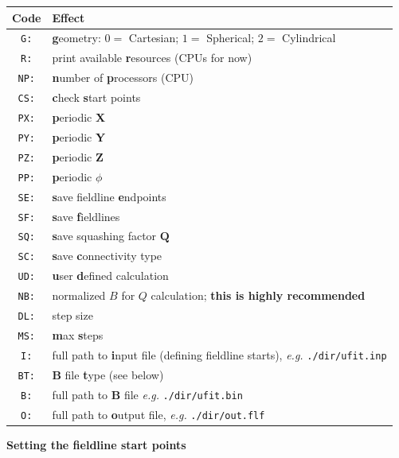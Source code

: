\documentclass[12pt,twoside]{article}
\begin{document}
\begin{tabular}{|c|l|}		
		\hline
		\textbf{Code} & \textbf{Effect} \\\hline\hline
		\texttt{G:} & \textbf{g}eometry: $0 =$ Cartesian; $1 =$ Spherical; $2 =$ Cylindrical  \\\hline
		\texttt{R:} & print available \textbf{r}esources (CPUs for now) \\\hline
		\texttt{NP:} &  \textbf{n}umber of \textbf{p}rocessors (CPU) \\\hline
		\texttt{CS:} & \textbf{c}heck \textbf{s}tart points \\\hline
		\texttt{PX:} & \textbf{p}eriodic \textbf{X} \\\hline
		\texttt{PY:} & \textbf{p}eriodic \textbf{Y}  \\\hline
		\texttt{PZ:} & \textbf{p}eriodic \textbf{Z}  \\\hline
		\texttt{PP:} & \textbf{p}eriodic $\phi$  \\\hline
		\texttt{SE:} & \textbf{s}ave fieldline \textbf{e}ndpoints \\\hline
		\texttt{SF:} & \textbf{s}ave \textbf{f}ieldlines \\\hline
		\texttt{SQ:} & \textbf{s}ave squashing factor $\mathbf{Q}$  \\\hline
		\texttt{SC:} & \textbf{s}ave \textbf{c}onnectivity type  \\\hline
		\texttt{UD:} & \textbf{u}ser \textbf{d}efined calculation  \\\hline
		\texttt{NB:} & normalized $B$ for $Q$ calculation; \textbf{this is highly recommended} \\\hline
		\texttt{DL:} & step size \\\hline
		\texttt{MS:} & \textbf{m}ax \textbf{s}teps  \\\hline
		\texttt{I:} & full path to \textbf{i}nput file (defining fieldline starts), \textit{e.g.} \texttt{./dir/ufit.inp} \\\hline
		\texttt{BT:} & $\mathbf{B}$ file \textbf{t}ype (see below) \\\hline
		\texttt{B:} & full path to $\mathbf{B}$ file \textit{e.g.} \texttt{./dir/ufit.bin} \\\hline
		\texttt{O:} & full path to \textbf{o}utput file, \textit{e.g.} \texttt{./dir/out.flf} \\\hline

\end{tabular}


\vspace{2mm}
{\Large \textbf{Setting the fieldline start points}}
\end{document}
